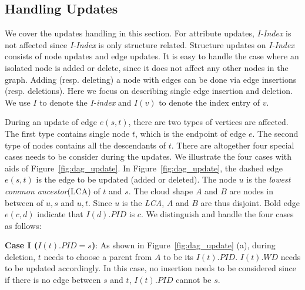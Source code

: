 \subsection{Handling Updates}
We cover the updates handling in this section. For attribute updates, \emph{I-Index} is not affected since \emph{I-Index} is only structure related. Structure updates on \emph{I-Index} consists of node updates and edge updates. It is easy to handle the case where an isolated node is added or delete, since it does not affect any other nodes in the graph. Adding (resp. deleting) a node with edges can be done via edge insertions (resp. deletions). Here we focus on describing single edge insertion and deletion. We use $I$ to denote the \emph{I-index} and $I(v)$ to denote the index entry of $v$. 

During an update of edge $e(s,t)$, there are two types of vertices are affected. The first type contains single node $t$, which is the endpoint of edge $e$. The second type of nodes contains all the descendants of $t$. There are altogether four special cases needs to be consider during the updates. We illustrate the four cases with aids of Figure~\ref{fig:dag_update}. In Figure~\ref{fig:dag_update}, the dashed edge $e(s,t)$ is the edge to be updated (added or deleted). The node $u$ is the \emph{lowest common ancestor}(LCA) of $t$ and $s$. The cloud shape $A$ and $B$ are nodes in between of $u,s$ and $u,t$. Since $u$ is the \emph{LCA}, $A$ and $B$ are thus disjoint. Bold edge $e(c,d)$ indicate that $I(d).PID$ is $c$. We distinguish and handle the four cases as follows:

\textbf{Case I ($I(t).PID = s$)}: As shown in Figure~\ref{fig:dag_update} (a), during deletion, $t$ needs to choose a parent from $A$ to be its $I(t).PID$. $I(t).WD$ needs to be updated accordingly. In this case, no insertion needs to be considered since if there is no edge between $s$ and $t$, $I(t).PID$ cannot be $s$. 

